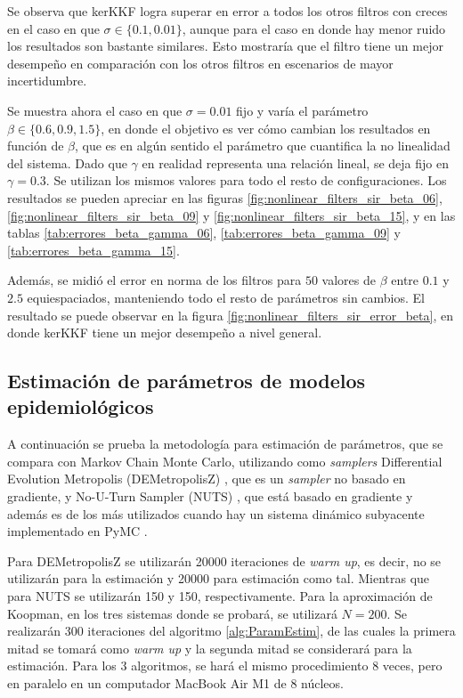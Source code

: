 Se observa que kerKKF logra superar en error a todos los otros filtros con creces en el caso en que $\sigma \in \{ 0.1, 0.01\}$, aunque para el caso en donde hay menor ruido los resultados son bastante similares. Esto mostraría que el filtro tiene un mejor desempeño en comparación con los otros filtros en escenarios de mayor incertidumbre.

Se muestra ahora el caso en que $\sigma = 0.01$ fijo y varía el parámetro $\beta \in \{0.6, 0.9, 1.5\}$, en donde el objetivo es ver cómo cambian los resultados en función de $\beta$, que es en algún sentido el parámetro que cuantifica la no linealidad del sistema. Dado que $\gamma$ en realidad representa una relación lineal, se deja fijo en $\gamma = 0.3$. Se utilizan los mismos valores para todo el resto de configuraciones. Los resultados se pueden apreciar en las figuras \ref{fig:nonlinear_filters_sir_beta_06}, \ref{fig:nonlinear_filters_sir_beta_09} y \ref{fig:nonlinear_filters_sir_beta_15}, y en las tablas \ref{tab:errores_beta_gamma_06}, \ref{tab:errores_beta_gamma_09} y \ref{tab:errores_beta_gamma_15}.

Además, se midió el error en norma de los filtros para $50$ valores de $\beta$ entre $0.1$ y $2.5$ equiespaciados, manteniendo todo el resto de parámetros sin cambios. El resultado se puede observar en la figura \ref{fig:nonlinear_filters_sir_error_beta}, en donde kerKKF tiene un mejor desempeño a nivel general.

\subsection{Estimación de parámetros de modelos epidemiológicos}

A continuación se prueba la metodología para estimación de parámetros, que se compara con Markov Chain Monte Carlo, utilizando como \textit{samplers} Differential Evolution Metropolis (DEMetropolisZ) \cite{terBraak2008DifferentialChains}, que es un \textit{sampler} no basado en gradiente, y No-U-Turn Sampler (NUTS) \cite{Hoffman2014TheCarlo}, que está basado en gradiente y además es de los más utilizados cuando hay un sistema dinámico subyacente implementado en PyMC \cite{Patil2010PyMC:Python}.

Para DEMetropolisZ se utilizarán 20000 iteraciones de \textit{warm up}, es decir, no se utilizarán para la estimación y 20000 para estimación como tal. Mientras que para NUTS se utilizarán 150 y 150, respectivamente. Para la aproximación de Koopman, en los tres sistemas donde se probará, se utilizará $N=200$. Se realizarán 300 iteraciones del algoritmo \ref{alg:ParamEstim}, de las cuales la primera mitad se tomará como \textit{warm up} y la segunda mitad se considerará para la estimación. Para los 3 algoritmos, se hará el mismo procedimiento 8 veces, pero en paralelo en un computador MacBook Air M1 de 8 núcleos.

